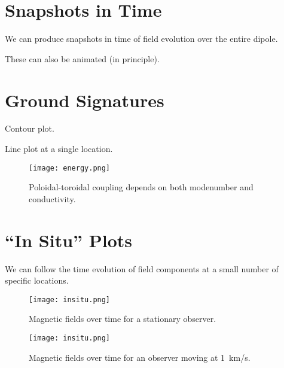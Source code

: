 \documentclass{article}
\begin{document}
\section{Snapshots in Time}

We can produce snapshots in time of field evolution over the entire dipole. 

These can also be animated (in principle). 

\section{Ground Signatures}

Contour plot. 

Line plot at a single location. 





\begin{figure}[h!]
  \texttt{[image: energy.png]}
  \caption{Poloidal-toroidal coupling depends on both modenumber and conductivity. }
\end{figure}





\section{``In Situ'' Plots}




We can follow the time evolution of field components at a small number of specific locations. 




\begin{figure}[h!]
  \texttt{[image: insitu.png]}
  \caption{Magnetic fields over time for a stationary observer. }
\end{figure}




\begin{figure}[h!]
  \texttt{[image: insitu.png]}
  \caption{Magnetic fields over time for an observer moving at \SI{1}{\km/\s}. }
\end{figure}
\end{document}
